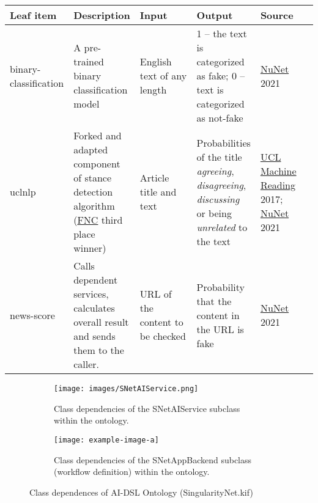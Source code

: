 \documentclass[]{report}
\begin{document}
\begin{table}[h]
	\begin{tabular}{p{0.2\linewidth}|p{0.2\linewidth}|p{0.2\linewidth}|p{0.2\linewidth}|p{0.2\linewidth}}
	\textbf{Leaf item} & \textbf{Description} & \textbf{Input} & \textbf{Output} & \textbf{Source}\\
	\hline
	binary-classification & A pre-trained binary classification model & English text of any length & 1 -- the text is categorized as fake; 0 -- text is categorized as not-fake & \textcopyright \href{https://gitlab.com/nunet/fake-news-detection/binary-classification}{NuNet} 2021\\
    \hline
	uclnlp & Forked and adapted component of stance detection algorithm (\href{http://www.fakenewschallenge.org/#fnc1results}{FNC} third place winner) & Article title and text & Probabilities of the title \textit{agreeing}, \textit{disagreeing}, \textit{discussing} or being \textit{unrelated} to the text & \textcopyright \href{https://github.com/uclnlp/fakenewschallenge}{UCL Machine Reading} 2017; \textcopyright \href{https://gitlab.com/nunet/fake-news-detection/uclnlp}{NuNet} 2021\\
	\hline
	news-score & Calls dependent services, calculates overall result and sends them to the caller. & URL of the content to be checked & Probability that the content in the URL is fake & \textcopyright \href{https://gitlab.com/nunet/fake-news-detection/fake_news_score}{NuNet} 2021 \\
\end{tabular}
\end{table}

\begin{figure}[h]
	\centering
	\begin{subfigure}[b]{1\textwidth}
		\centering
		\texttt{[image: images/SNetAIService.png]}
		\caption{Class dependencies of the SNetAIService subclass within the ontology.}
		\label{fig:SNetAIService hierachy}
	\end{subfigure}
	\begin{subfigure}[b]{1\textwidth}
		\centering
		\texttt{[image: example-image-a]}
		\caption{Class dependencies of the SNetAppBackend subclass (workflow definition) within the ontology.}
		\label{fig:tSNetAppBackend}
	\end{subfigure}
	\caption{Class dependences of AI-DSL Ontology (SingularityNet.kif) }
	\label{fig:SingularityNet.kif}
\end{figure}
\end{document}
